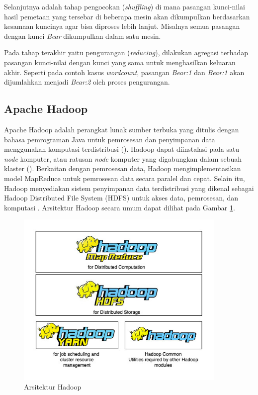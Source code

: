 Selanjutnya adalah tahap pengocokan (\textit{shuffling}) di mana pasangan kunci-nilai hasil pemetaan yang tersebar di beberapa mesin akan dikumpulkan berdasarkan kesamaan kuncinya agar bisa diproses lebih lanjut. Misalnya semua pasangan dengan kunci \textit{Bear} dikumpulkan dalam satu mesin.

Pada tahap terakhir yaitu pengurangan (\textit{reducing}), dilakukan agregasi terhadap pasangan kunci-nilai dengan kunci yang sama untuk menghasilkan keluaran akhir. Seperti pada contoh kasus \textit{wordcount}, pasangan \textit{Bear:1} dan \textit{Bear:1} akan dijumlahkan menjadi \textit{Bear:2} oleh proses pengurangan.

\subsection{Apache Hadoop}
Apache Hadoop adalah perangkat lunak sumber terbuka yang ditulis dengan bahasa pemrograman Java untuk pemrosesan dan penyimpanan data menggunakan komputasi terdistribusi (\cite{ApacheHadoop}). Hadoop dapat diinstalasi pada satu \textit{node} komputer, atau ratusan \textit{node} komputer yang digabungkan dalam sebuah klaster (\cite{maneasEvolutionHadoopDistributed2018}). Berkaitan dengan pemrosesan data, Hadoop mengimplementasikan model MapReduce untuk pemrosesan data secara paralel dan cepat. Selain itu, Hadoop menyediakan sistem penyimpanan data terdistribusi yang dikenal sebagai Hadoop Distributed File System (HDFS) untuk akses data, pemrosesan, dan komputasi \cite{dabasAnalysisCommentsYoutube2019}. Arsitektur Hadoop secara umum dapat dilihat pada Gambar \ref{fig:hadoop-str}.

\begin{figure}[h!]
    \centering
    \includegraphics[width=0.9\textwidth]{figures/ch02/hadoop-str}
    \caption{Arsitektur Hadoop}
    \label{fig:hadoop-str}
\end{figure}

